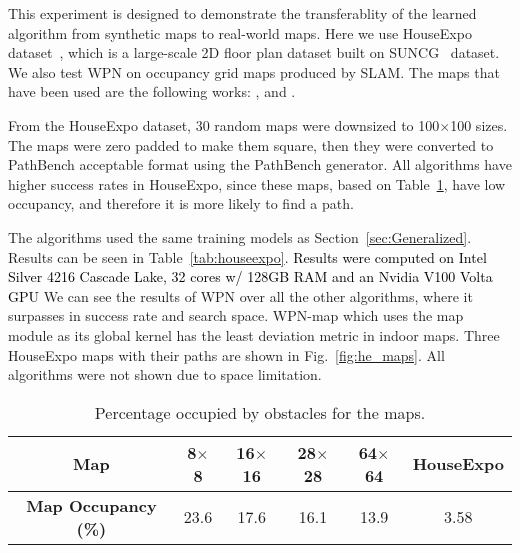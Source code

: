 \documentclass[journal, twocolumn]{IEEEtran}
\begin{document}
This experiment is designed to demonstrate the transferablity of the learned algorithm from synthetic maps to real-world maps. Here we use HouseExpo dataset~\cite{houseexpo}, which is a large-scale 2D floor plan dataset built on SUNCG~\cite{suncg}  dataset. We also test WPN on occupancy grid maps produced by SLAM. The maps that have been used are the following works: \cite{first_map}, \cite{second_map} and \cite{third_map}. 

 From the HouseExpo dataset, 30 random maps were downsized to 100$\times$100 sizes. The maps were zero padded to make them square, then they were converted to PathBench acceptable format using the PathBench generator. All algorithms have higher success rates in HouseExpo, since these maps, based on Table~\ref{tab:mapoccupancy}, have low occupancy, and therefore it is more likely to find a path.\par

The algorithms used the same training models as Section~\ref{sec:Generalized}. Results can be seen in Table~\ref{tab:houseexpo}. \textcolor{black}{Results were computed on Intel Silver 4216 Cascade Lake, 32 cores w/ 128GB RAM and an
Nvidia V100 Volta GPU} We can see the results of WPN over all the other algorithms, where it surpasses in success rate and search space. WPN-map which uses the map module as its global kernel has the least deviation metric in indoor maps. Three HouseExpo maps with their paths are shown in Fig.~\ref{fig:he_maps}. All algorithms were not shown due to space limitation.

\begin{table}[t]
\centering
\caption{Percentage occupied by obstacles for the maps.}
\vspace{-2 mm}
\begin{tabular}{@{}c|c|c|c|c|c@{}}
\toprule
\textbf{\scriptsize Map}                      & \textbf{\scriptsize 8$\times$8}               & \textbf{\scriptsize 16$\times$16}            & \textbf{\scriptsize 28$\times$28}             & \textbf{\scriptsize 64$\times$64}             & \textbf{\scriptsize HouseExpo}         \\ \midrule
{\textbf{\scriptsize Map Occupancy (\%) }} & {\scriptsize 23.6} & {\scriptsize 17.6} & {\scriptsize 16.1} & {\scriptsize 13.9} & {\scriptsize 3.58} \\ 
\bottomrule
\end{tabular}
\label{tab:mapoccupancy}
\end{table}
\end{document}
